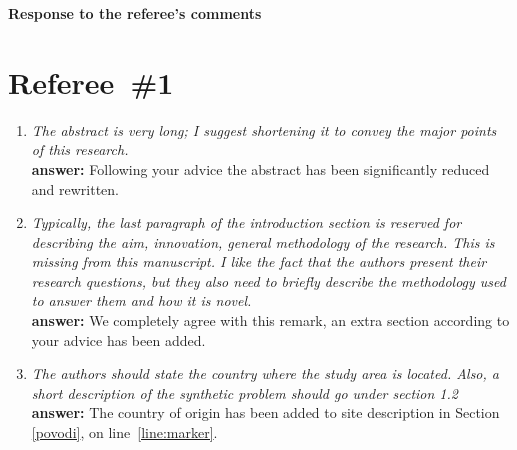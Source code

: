 \documentclass[final,3p, 11pt, a4paper]{elsarticle}
\begin{document}
\begin{center}
{\Large \bf Response to the referee's comments}
\end{center}

\section*{Referee~\#1}

\begin{enumerate}
\item {\it    The abstract is very long; I suggest shortening it to convey the major points of this research.} \\
{\bf answer:} Following your advice  the abstract has been significantly reduced and rewritten.

\item {\it Typically, the last paragraph of the introduction section is reserved for describing the aim, innovation, general methodology of the research. This is missing from this manuscript. I like the fact that the authors present their research questions, but they also need to briefly describe the methodology used to answer them and how it is novel.} \\ 
{\bf  answer:} We completely agree with this remark, an extra section according to your advice has been added.

\item {\it The authors should state the country where the study area is located. Also, a short description of the synthetic problem should go under section 1.2} \\
{\bf  answer:} 
The country of origin has been added to site description  in Section \ref{povodi}, on line~\ref{line:marker}.


\end{enumerate}
\end{document}
